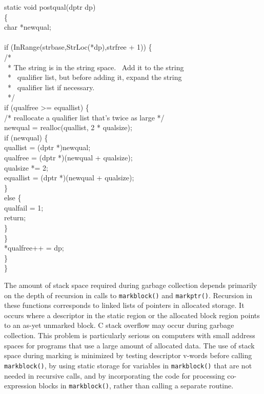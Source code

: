 \begin{iconcode}
static void postqual(dptr dp)\\
\>\{\\
\>char *newqual;\\
\\
\>if (InRange(strbase,StrLoc(*dp),strfree + 1)) \{\\
\>\>/*\\
\>\>\ * The string is in the string space. \ Add it to the string\\
\>\>\ * \ qualifier list, but before adding it, expand the string\\
\>\>\ * \ qualifier list if necessary.\\
\>\>\ */\\
\>\>if (qualfree >= equallist) \{\\
\>\>\>/* reallocate a qualifier list that's twice as large */\\
\>\>\>newqual = realloc(quallist, 2 * qualsize);\\
\>\>\>if (newqual) \{\\
\>\>\>\>quallist = (dptr *)newqual;\\
\>\>\>\>qualfree = (dptr *)(newqual + qualsize);\\
\>\>\>\>qualsize *= 2;\\
\>\>\>\>equallist = (dptr *)(newqual + qualsize);\\
\>\>\>\>\}\\
\>\>\>else \{\\
\>\>\>\>qualfail = 1;\\
\>\>\>\>return;\\
\>\>\>\>\}\\
\>\>\>\}\\
\>\>*qualfree++ = dp;\\
\>\>\}\\
\>\}
\end{iconcode}

The amount of stack space required during garbage collection depends
primarily on the depth of recursion in calls to \texttt{markblock()}
and \texttt{markptr()}. Recursion in these functions corresponds to
linked lists of pointers in allocated storage. It occurs where a
descriptor in the static region or the allocated block region points
to an as-yet unmarked block. C stack overflow may occur during garbage
collection. This problem is particularly serious on computers with
small address spaces for programs that use a large amount of allocated
data. The use of stack space during marking is minimized by testing
descriptor v-words before calling \texttt{markblock()}, by using
static storage for variables in \texttt{markblock()} that are not
needed in recursive calls, and by incorporating the code for
processing co-expression blocks in \texttt{markblock()}, rather than
calling a separate routine.

